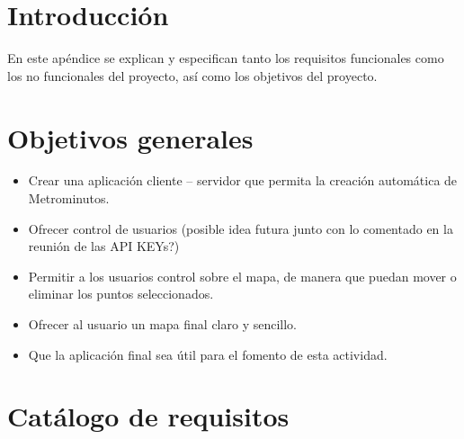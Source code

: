 
\section{Introducción}
En este apéndice se explican y especifican tanto los requisitos funcionales como los no funcionales del proyecto, así como los objetivos del proyecto.

\section{Objetivos generales}

\begin{itemize}
	\item Crear una aplicación cliente -- servidor que permita la creación automática de Metrominutos.
    \item Ofrecer control de usuarios (posible idea futura junto con lo comentado en la reunión de las API KEYs?)
    \item Permitir a los usuarios control sobre el mapa, de manera que puedan mover o eliminar los puntos seleccionados.
    \item Ofrecer al usuario un mapa final claro y sencillo.
    \item Que la aplicación final sea útil para el fomento de esta actividad.
\end{itemize}

\section{Catálogo de requisitos}

